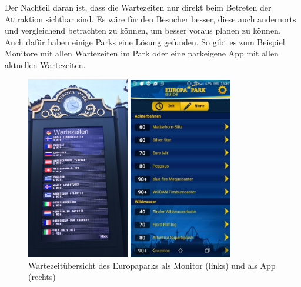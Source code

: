 Der Nachteil daran ist, dass die Wartezeiten  nur direkt beim Betreten der Attraktion sichtbar sind. Es wäre für den Besucher besser, diese auch andernorts und vergleichend betrachten zu können, um besser voraus planen zu können. Auch dafür haben einige Parks eine Lösung gefunden. So gibt es zum Beispiel Monitore mit allen Wartezeiten im Park oder eine parkeigene App mit allen aktuellen Wartezeiten. 

\begin{figure}[h]
    \centering
    \begin{minipage}{0.49\textwidth}
        \centering
        \includegraphics[width=0.4\textwidth]{img/motivation/wartezeit_anzeige.jpg}
    \end{minipage}
    \begin{minipage}{0.49\textwidth}
        \centering
        \includegraphics[width=0.4\textwidth]{img/motivation/app_official.jpg}
    \end{minipage}
\caption[Wartezeitübersicht im Europapark]{Wartezeitübersicht des Europaparks als Monitor (links) und als App (rechts)\footnotemark}
		\label{figure:grundlagenwaittime2}
\end{figure}

